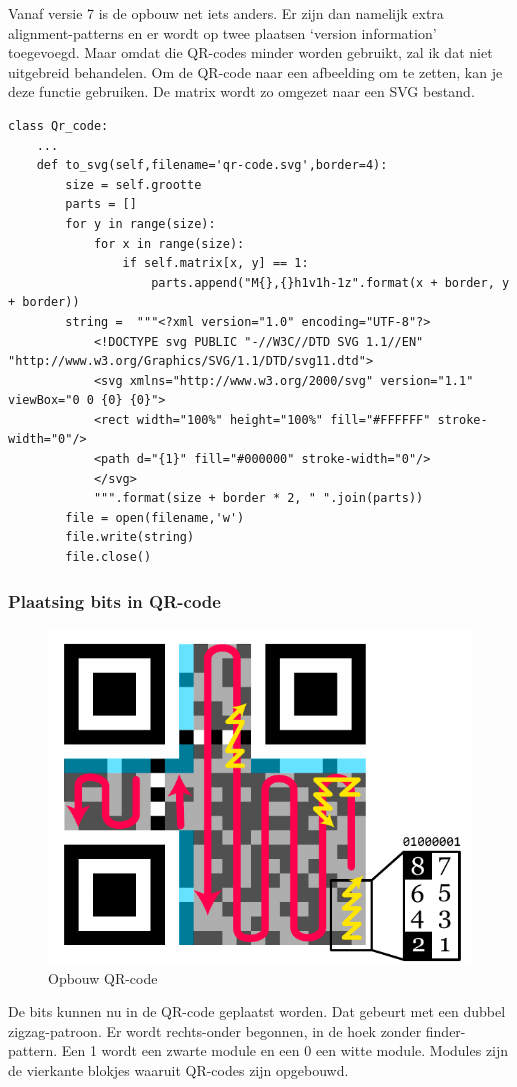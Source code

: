 \documentclass[a4paper]{article}
\begin{document}
Vanaf versie 7 is de opbouw net iets anders. Er zijn dan namelijk extra alignment-patterns en er wordt op twee plaatsen `version information' toegevoegd. Maar omdat die QR-codes minder worden gebruikt, zal ik dat niet uitgebreid behandelen.
Om de QR-code naar een afbeelding om te zetten, kan je deze functie gebruiken. De matrix wordt zo omgezet naar een SVG bestand.
\begin{verbatim}
class Qr_code:
    ...
    def to_svg(self,filename='qr-code.svg',border=4):
        size = self.grootte
        parts = []
        for y in range(size):
            for x in range(size):
                if self.matrix[x, y] == 1:
                    parts.append("M{},{}h1v1h-1z".format(x + border, y + border))
        string =  """<?xml version="1.0" encoding="UTF-8"?>
            <!DOCTYPE svg PUBLIC "-//W3C//DTD SVG 1.1//EN" "http://www.w3.org/Graphics/SVG/1.1/DTD/svg11.dtd">
            <svg xmlns="http://www.w3.org/2000/svg" version="1.1" viewBox="0 0 {0} {0}">
            <rect width="100%" height="100%" fill="#FFFFFF" stroke-width="0"/>
            <path d="{1}" fill="#000000" stroke-width="0"/>
            </svg>
            """.format(size + border * 2, " ".join(parts))
        file = open(filename,'w')
        file.write(string)
        file.close()
\end{verbatim}
\subsubsection{Plaatsing bits in QR-code}
\begin{figure}[htbp]
\centering
\includegraphics[width=0.6\linewidth]{zigzag.pdf}
\caption{Opbouw QR-code}
\label{fig:zigzag}
\end{figure}
De bits kunnen nu in de QR-code geplaatst worden. Dat gebeurt met een dubbel zigzag-patroon. Er wordt rechts-onder begonnen, in de hoek zonder finder-pattern. Een 1 wordt een zwarte module en een 0 een witte module. Modules zijn de vierkante blokjes waaruit QR-codes zijn opgebouwd.
\end{document}
